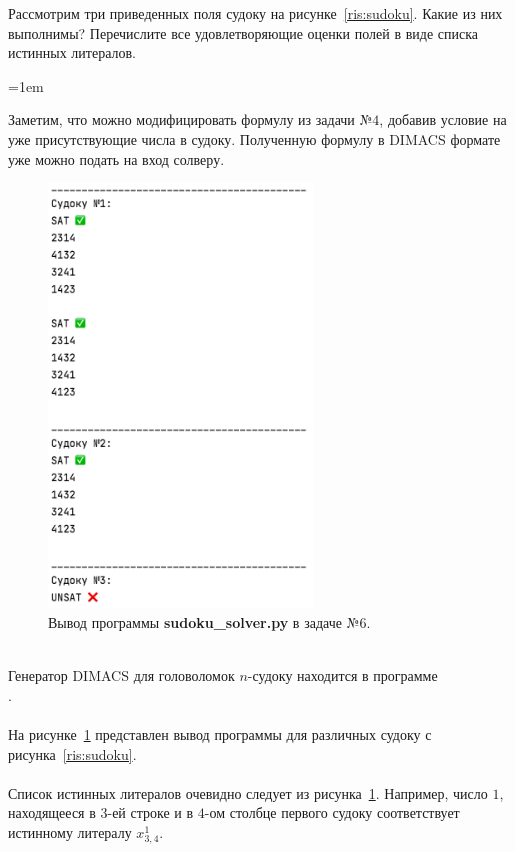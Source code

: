 \documentclass[12pt]{extreport}
\theoremstyle{definiton}
\theoremstyle{definition}
\theoremstyle{definition}
\newcommand{\solution}[2][\color{myblue}Решение]{
\medskip
	\noindent{\bfseries #1 }{{\color{myblue}\bfseries #2:}}
}
\newenvironment{blockquote}{%
  \par%
  \medskip
  \leftskip=1em%
  \noindent}{%
  \par\medskip}
\begin{document}
\Pr[5 баллов] Рассмотрим три приведенных поля судоку на рисунке~\ref{ris:sudoku}. Какие из них выполнимы? Перечислите все удовлетворяющие оценки полей в виде списка истинных литералов.



\solution{6}
\begin{blockquote}
{\color{myblue}
\noindent Заметим, что можно модифицировать формулу из задачи №$4$, добавив условие на уже присутствующие числа в судоку. Полученную формулу в DIMACS формате уже можно подать на вход солверу.
\begin{figure}[H]
    \centering
    \includegraphics[width=7.0cm]{images/sudoku_solver.png}
    \caption{Вывод программы \textbf{sudoku\_solver.py} в задаче №$6$.}
    \label{ris:sudoku_solver}
\end{figure}
\\
Генератор DIMACS для головоломок $n$-судоку находится в программе\\ {}.\\
\\
На рисунке~\ref{ris:sudoku_solver} представлен вывод программы для различных судоку с рисунка~\ref{ris:sudoku}.\\
\\
Список истинных литералов очевидно следует из рисунка~\ref{ris:sudoku_solver}. Например, число $1$, находящееся в $3$-ей строке и в $4$-ом столбце первого судоку соответствует истинному литералу $x_{3, 4}^1$.
}
\end{blockquote}
			
			
\end{document}
